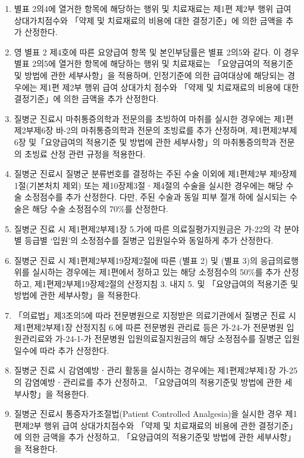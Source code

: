 \begin{enumerate}[1.]
\item 별표 2의4에 열거한 항목에 해당하는 행위 및 치료재료는 제1편 제2부 행위 급여 상대가치점수와 「약제 및 치료재료의 비용에 대한 결정기준」에 의한 금액을 추가 산정한다.
\item 영 별표 2 제4호에 따른 요양급여 항목 및 본인부담률은 별표 2의5와 같다. 이 경우 별표 2의5에 열거한 항목에 해당하는 행위 및 치료재료는 「요양급여의 적용기준 및 방법에 관한 세부사항」을 적용하며, 인정기준에 의한 급여대상에 해당되는 경우에는 제1편 제2부 행위 급여 상대가치 점수와 「약제 및 치료재료의 비용에 대한 결정기준」에 의한 금액을 추가 산정한다.
\item 질병군 진료시 마취통증의학과 전문의를 초빙하여 마취를 실시한 경우에는 제1편제2부제6장 바-2의 마취통증의학과 전문의 초빙료를 추가 산정하며, 제1편제2부제6장 및「요양급여의 적용기준 및 방법에 관한 세부사항」의 마취통증의학과 전문의 초빙료 산정 관련 규정을 적용한다.
\item 질병군 진료시 질병군 분류번호를 결정하는 주된 수술 이외에 제1편제2부 제9장제1절(기본처치 제외) 또는 제10장제3절ㆍ제4절의 수술을 실시한 경우에는 해당 수술 소정점수를 추가 산정한다. 다만, 주된 수술과 동일 피부 절개 하에 실시되는 수술은 해당 수술 소정점수의 70\%를 산정한다.
\item 질병군 진료 시 제1편제2부제1장 5.가에 따른 의료질평가지원금은 가-22의 각 분야별 등급별 ‘입원’의 소정점수를 질병군 입원일수와 동일하게 추가 산정한다.
\item 질병군 진료 시 제1편제2부제19장제2절에 따른 (별표 2) 및 (별표 3)의 응급의료행위를 실시하는 경우에는 제1편에서 정하고 있는 해당 소정점수의 50\%를 추가 산정하고, 제1편제2부제19장제2절의 산정지침 3. 내지 5. 및 「요양급여의 적용기준 및 방법에 관한 세부사항」을 적용한다.
\item「의료법」제3조의5에 따라 전문병원으로 지정받은 의료기관에서 질병군 진료 시 제1편제2부제1장 산정지침 6.에 따른 전문병원 관리료 등은 가-24-가 전문병원 입원관리료와 가-24-1-가 전문병원 입원의료질지원금의 해당 소정점수를 질병군 입원일수에 따라 추가 산정한다.
\item 질병군 진료 시 감염예방ㆍ관리 활동을 실시하는 경우에는 제1편제2부제1장 가-25의 감염예방ㆍ관리료를 추가 산정하고, 「요양급여의 적용기준및 방법에 관한 세부사항」을 적용한다.
\item 질병군 진료시 통증자가조절법(Patient Controlled Analgesia)을 실시한 경우 제1편제2부 행위 급여 상대가치점수와 「약제 및 치료재료의 비용에 관한 결정기준」에 의한 금액을 추가 산정하고, 「요양급여의 적용기준및 방법에 관한 세부사항」을 적용한다.
\end{enumerate}
